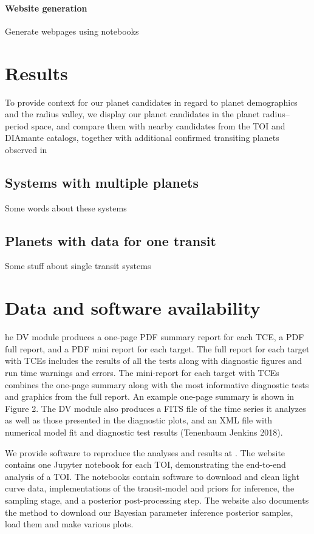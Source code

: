 \documentclass[floatfix,ApJL,twocolumn]{aastex631}
\begin{document}
\paragraph{Website generation}
Generate webpages using notebooks



\section{Results}\label{sec:results}


To provide context for our planet candidates in regard to
planet demographics and the radius valley, we display our
planet candidates in the planet radius–period space, and compare them with nearby candidates from the TOI and DIAmante catalogs, together with additional confirmed transiting planets observed in




\subsection{Systems with multiple planets}
Some words about these systems

\subsection{Planets with data for one transit}
Some stuff about single transit systems


\section{Data and software availability}\label{sec:data}

he DV module produces a one-page PDF summary report for each TCE, a PDF full report, and a PDF mini report for each target. The full report for each target with TCEs includes the results of all the tests along with diagnostic figures and run time warnings and errors. The mini-report for each target with TCEs combines the one-page summary along with the most informative diagnostic tests and graphics from the full report. An example one-page summary is shown in Figure 2. The DV module also produces a FITS file of the time series it analyzes as well as those presented in the diagnostic plots, and an XML file with numerical model fit and diagnostic test results (Tenenbaum  Jenkins 2018).

We provide software to reproduce the analyses and results at \atlasUrl.
The website contains one Jupyter notebook for each TOI, demonstrating the end-to-end analysis of a TOI.
The notebooks contain software to download and clean light curve data, implementations of the transit-model and priors for inference, the \pymc sampling stage, and a posterior post-processing step.
The website also documents the method to download our Bayesian parameter inference posterior samples, load them and make various plots.
\end{document}
